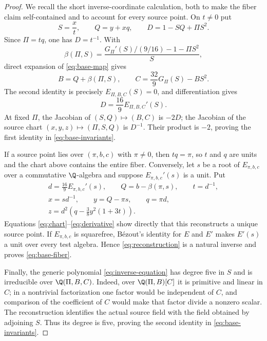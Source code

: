 \begin{proof}
We recall the short inverse-coordinate calculation, both to make the fiber
claim self-contained and to account for every source point.  On \(t\ne0\)
put
\[
 S=\frac{x}{t},\qquad Q=y+xq,\qquad
 D=1-SQ+\Pi S^2.
 \tag{2.10}\label{eq:chart}
\]
Since \(\Pi=tq\), one has \(D=t^{-1}\).  With
\[
 \beta(\Pi,S)
 =\frac{G_\Pi'(S)/(9/16)-1-\Pi S^2}{S},
 \tag{2.11}\label{eq:beta}
\]
direct expansion of \eqref{eq:base-map} gives
\[
 B=Q+\beta(\Pi,S),\qquad
 C=\frac{32}{9}G_\Pi(S)-BS^2.
 \tag{2.12}\label{eq:compact-target}
\]
The second identity is precisely \(E_{\Pi,B,C}(S)=0\), and differentiation
gives
\[
 D=\frac{16}{9}E_{\Pi,B,C}'(S).
 \tag{2.13}\label{eq:derivative}
\]
At fixed \(\Pi\), the Jacobian of \((S,Q)\mapsto(B,C)\) is \(-2D\);
the Jacobian of the source chart
\((x,y,z)\mapsto(\Pi,S,Q)\) is \(D^{-1}\).  Their product is \(-2\), proving
the first identity in \eqref{eq:base-invariants}.

If a source point lies over \((\pi,b,c)\) with \(\pi\ne0\), then
\(tq=\pi\), so \(t\) and \(q\) are units and the chart above contains the
entire fiber.  Conversely, let \(s\) be a root of \(E_{\pi,b,c}\) over a
commutative \(\Q\)-algebra and suppose \(E_{\pi,b,c}'(s)\) is a unit.  Put
\[
 \begin{gathered}
 d=\frac{16}{9}E_{\pi,b,c}'(s),\qquad
 Q=b-\beta(\pi,s),\qquad t=d^{-1},\\
 x=sd^{-1},\qquad y=Q-\pi s,\qquad q=\pi d,\\
 z=d^2\left(q-\frac38y^2(1+3t)\right).
 \end{gathered}
 \tag{2.14}\label{eq:reconstruction}
\]
Equations \eqref{eq:chart}--\eqref{eq:derivative} show directly that this reconstructs a
unique source point.  If \(E_{\pi,b,c}\) is squarefree, B\'ezout's identity
for \(E\) and \(E'\) makes \(E'(s)\) a unit over every test algebra.  Hence
\eqref{eq:reconstruction} is a natural inverse and proves \eqref{eq:base-fiber}.

Finally, the generic polynomial \eqref{eq:inverse-equation} has degree five in \(S\) and is
irreducible over \(\Q(\Pi,B,C)\).  Indeed, over
\(\Q(\Pi,B)[C]\) it is primitive and linear in \(C\); in a nontrivial
factorization one factor would be independent of \(C\), and comparison of
the coefficient of \(C\) would make that factor divide a nonzero scalar.
The reconstruction identifies the actual source field with the field
obtained by adjoining \(S\).  Thus its degree is five, proving the second
identity in \eqref{eq:base-invariants}.
\end{proof}


